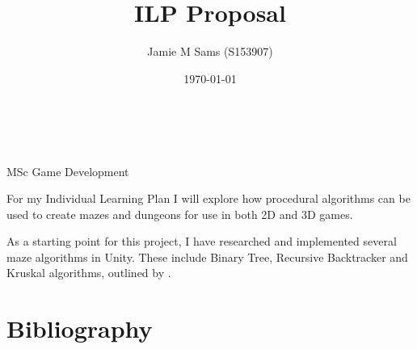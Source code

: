 \documentclass[a4paper, 12pt]{article}
\title{ILP Proposal}
\author{Jamie M Sams (S153907)}
\date{\today}
\begin{document}

\begin{titlepage}
	\vspace*{\fill}
	\centering
	{\huge \thetitle}\\[.5cm]
	{\large \theauthor}\\[.5cm]
	{MSc Game Development}
	\vspace*{\fill}
\end{titlepage}

\lhead{\theauthor}

For my Individual Learning Plan I will explore how procedural algorithms can be used to create mazes and dungeons for use in both 2D and 3D games.

As a starting point for this project, I have researched and implemented several maze algorithms in Unity.  These include Binary Tree, Recursive Backtracker and Kruskal algorithms, outlined by \cite{Buck2015}.

\section{Bibliography}

\printbibliography[heading=none]
\end{document}

